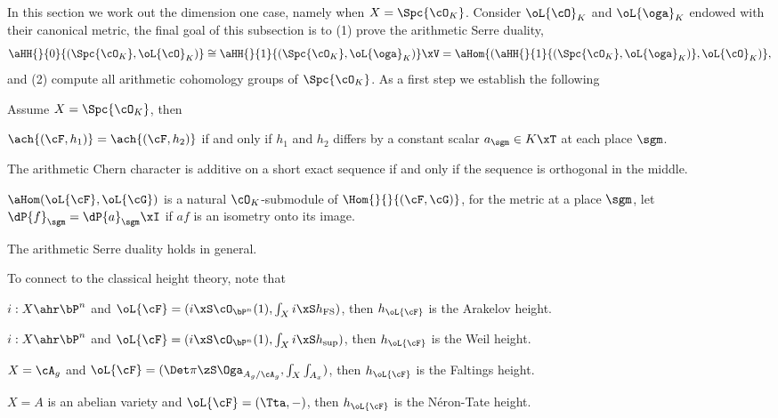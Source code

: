 \documentclass[article, a4paper, twoside]{universal}
\begin{document}
\begin{prf}
\end{prf}



In this section we work out the dimension one case, namely when $X=\Spc{\cO_{K}}$. Consider $\oL{\cO}_{K}$ and $\oL{\oga}_{K}$ endowed with their canonical metric, the final goal of this subsection is to (1) prove the arithmetic Serre duality,
\[
	\aHH{}{0}{(\Spc{\cO_{K}},\oL{\cO}_{K})}\cong\aHH{}{1}{(\Spc{\cO_{K}},\oL{\oga}_{K})}\xV=\aHom{(\aHH{}{1}{(\Spc{\cO_{K}},\oL{\oga}_{K})},\oL{\cO}_{K})},
\]
and (2) compute all arithmetic cohomology groups of $\Spc{\cO_{K}}$. As a first step we establish the following
\begin{thm}
	Assume $X=\Spc{\cO_{K}}$, then
	\begin{itm}
		\item $\ach{(\cF,h_{1})}=\ach{(\cF,h_{2})}$ if and only if $h_{1}$ and $h_{2}$ differs by a constant scalar $a_{\sgm}\in K\xT$ at each place $\sgm$.
		\item The arithmetic Chern character is additive on a short exact sequence if and only if the sequence is orthogonal in the middle.
		\item $\aHom(\oL{\cF},\oL{\cG})$ is a natural $\cO_{K}$-submodule of $\Hom{}{}{(\cF,\cG)}$, for the metric at a place $\sgm$, let $\dP{f}_{\sgm}=\dP{a}_{\sgm}\xI$ if $af$ is an isometry onto its image.
	\end{itm}
\end{thm}

\begin{prf}
\end{prf}

\begin{thm}
	The arithmetic Serre duality holds in general.
\end{thm}



\begin{prp}
	To connect to the classical height theory, note that
	\begin{enr}
		\item $i:X\ahr\bP^{n}$ and $\oL{\cF}=(i\xS\cO_{\bP^{n}}(1),\int_{X}i\xS h_{\mathrm{FS}})$, then $h_{\oL{\cF}}$ is the Arakelov height.
		\item $i:X\ahr\bP^{n}$ and $\oL{\cF}=(i\xS\cO_{\bP^{n}}(1),\int_{X}i\xS h_{\mathrm{sup}})$, then $h_{\oL{\cF}}$ is the Weil height.
		\item $X=\cA_{g}$ and $\oL{\cF}=(\Det\pi\zS\Oga_{A_{g}/\cA_{g}},\int_{X}\int_{A_{x}})$, then $h_{\oL{\cF}}$ is the Faltings height.
		\item $X=A$ is an abelian variety and $\oL{\cF}=(\Tta,-)$, then $h_{\oL{\cF}}$ is the N{\'e}ron-Tate height.
	\end{enr}
\end{prp}
\end{document}
